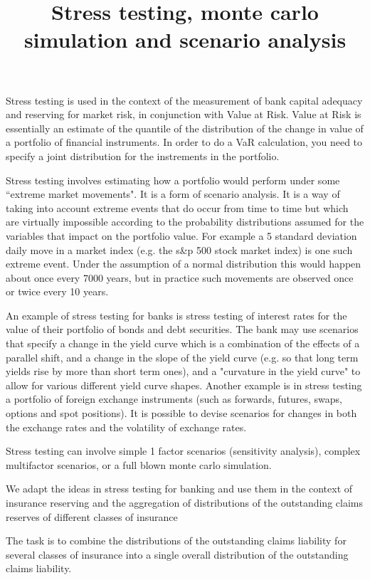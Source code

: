 \documentclass[12pt,a4paper]{article}
\title{Stress testing, monte carlo simulation and scenario analysis}
\begin{document}
\maketitle

Stress testing is used in the context of the measurement of bank capital adequacy and reserving for market risk, in conjunction with Value at Risk. Value at Risk is essentially an estimate of the quantile of the distribution of the change in value of a portfolio of financial instruments. In order to do a VaR calculation, you need to specify a joint distribution for the instrements in the portfolio.

Stress testing involves estimating how a portfolio would perform under some ``extreme market movements". It is a form of scenario analysis. It is a way of taking into account extreme events that do occur from time to time but which are virtually impossible according to the probability distributions assumed for the variables that impact on the portfolio value. For example a 5 standard deviation daily move in a market index (e.g. the s\&p 500 stock market index) is one such extreme event. Under the assumption of a normal distribution this would happen about once every 7000 years, but in practice such movements are observed once or twice every 10 years.

An example of stress testing for banks is stress testing of interest rates for the value of their portfolio of bonds and debt securities. The bank may use scenarios that specify a change in the yield curve which is a combination of the effects of a parallel shift, and a change in the slope of the yield curve (e.g. so that long term yields rise by more than short term ones), and a "curvature in the yield curve" to allow for various different yield curve shapes. Another example is in stress testing a portfolio of foreign exchange instruments (such as forwards, futures, swaps, options and spot positions). It is possible to devise scenarios for changes in both the exchange rates and the volatility of exchange rates.

Stress testing can involve simple 1 factor scenarios (sensitivity analysis), complex multifactor scenarios, or a full blown monte carlo simulation.

We adapt the ideas in stress testing for banking and use them in the context of insurance reserving and the aggregation of distributions of the outstanding claims reserves of different classes of insurance

The task is to combine the distributions of the outstanding claims liability  for several classes of insurance into a single overall distribution of the outstanding claims liability.
\end{document}
